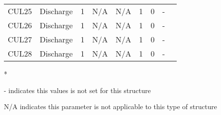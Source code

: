 \begin{table}[h]
\begin{tabular}{@{}lcccccccc@{}}
{CUL25}         & Discharge     & 1        & N/A         & N/A          & 1           & 0               & -            \\
{CUL26}         & Discharge     & 1        & N/A         & N/A          & 1           & 0               & -            \\
{CUL27}         & Discharge     & 1        & N/A         & N/A          & 1           & 0               & -            \\
{CUL28}         & Discharge     & 1        & N/A         & N/A          & 1           & 0               & -            \\
\hline
\end{tabular}

* \cite{corp2005}

- indicates this values is not set for this structure

N/A indicates this parameter is not applicable to this type of structure
\end{table}
\normalsize
\clearpage


